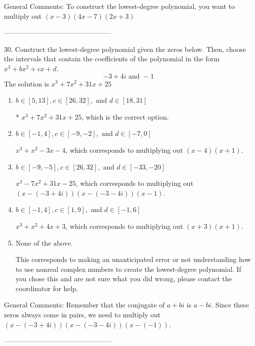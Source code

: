 \documentclass{extbook}[14pt]
\begin{document}
General Comments: To construct the lowest-degree polynomial, you want to multiply out $(x -3)(4x -7)(2x + 3)$

-----------------------------------------------

30. Construct the lowest-degree polynomial given the zeros below. Then, choose the intervals that contain the coefficients of the polynomial in the form $x^3+bx^2+cx+d$.
\[ -3 + 4i \text{ and } -1 \] 
The solution is $ x^{3} +7 x^{2} +31 x + 25 $ 

\begin{enumerate}[label=\Alph*.] 
\item $ b \in [5, 13], c \in [26, 32], \text{ and } d \in [18, 31] $ 

 * $x^{3} +7 x^{2} +31 x + 25$, which is the correct option. 
\item $ b \in [-1, 4], c \in [-9, -2], \text{ and } d \in [-7, 0] $ 

 $x^{3} + x^{2} -3 x -4$, which corresponds to multiplying out $(x -4)(x + 1)$. 
\item $ b \in [-9, -5], c \in [26, 32], \text{ and } d \in [-33, -20] $ 

 $x^{3} -7 x^{2} +31 x -25$, which corresponds to multiplying out $(x-(-3 + 4i))(x-(-3 - 4i))(x -1)$. 
\item $ b \in [-1, 4], c \in [1, 9], \text{ and } d \in [-1, 6] $ 

 $x^{3} + x^{2} +4 x + 3$, which corresponds to multiplying out $(x + 3)(x + 1)$. 
\item $ \text{None of the above.} $ 

 This corresponds to making an unanticipated error or not understanding how to use nonreal complex numbers to create the lowest-degree polynomial. If you chose this and are not sure what you did wrong, please contact the coordinator for help. 
\end{enumerate} 
 
General Comments: Remember that the conjugate of $a+bi$ is $a-bi$. Since these zeros always come in pairs, we need to multiply out $(x-(-3 + 4i))(x-(-3 - 4i))(x-(-1))$.

-----------------------------------------------
\end{document}
